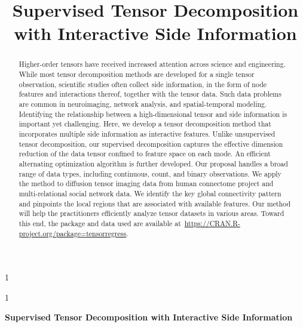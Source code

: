 \documentclass[12pt]{article}
\newcommand{\blind}{1}
\theoremstyle{plain}
\theoremstyle{definition}
\begin{document}
\def\spacingset#1{\renewcommand{\baselinestretch}%
{#1}\small\normalsize} \spacingset{1}



\blind
{
  \title{\bf Supervised Tensor Decomposition with Interactive Side Information}
  \maketitle
} \fi

\blind
{
  \bigskip
  \bigskip
  \bigskip
  \begin{center}
    {\LARGE\bf Supervised Tensor Decomposition with Interactive Side Information}
\end{center}
  \medskip
} \fi

\bigskip
\begin{abstract}
Higher-order tensors have received increased attention across science and engineering. While most tensor decomposition methods are developed for a single tensor observation, scientific studies often collect side information, in the form of node features and interactions thereof, together with the tensor data. Such data problems are common in neuroimaging, network analysis, and spatial-temporal modeling. Identifying the relationship between a high-dimensional tensor and side information is important yet challenging. Here, we develop a tensor decomposition method that incorporates multiple side information as interactive features. Unlike unsupervised tensor decomposition, our supervised decomposition captures the effective dimension reduction of the data tensor confined to feature space on each mode. An efficient alternating optimization algorithm is further developed. Our proposal handles a broad range of data types, including continuous, count, and binary observations. We apply the method to diffusion tensor imaging data from human connectome project and multi-relational social network data. We identify the key global connectivity pattern and pinpoints the local regions that are associated with available features. Our method will help the practitioners efficiently analyze tensor datasets in various areas. Toward this end, the package and data used are available at~\url{https://CRAN.R-project.org/package=tensorregress}.

\end{abstract}
\end{document}
